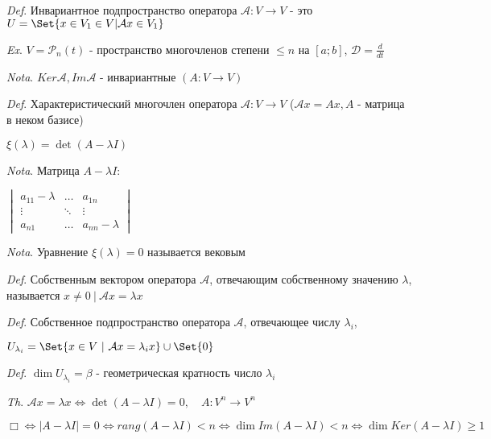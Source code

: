 \documentclass[12pt]{article}
\begin{document}
    \vspace{3mm}
\textit{Def}. Инвариантное подпространство оператора $\mathcal{A} : V \rightarrow V$ -
    это $U = \Set{x \in V_1 \in V | \mathcal{A}x \in V_1}$

    \vspace{3mm}
\textit{Ex}. $V = \mathcal{P}_n(t)$ - пространство многочленов степени $\leq n$ на $[a; b]$, $\displaystyle \mathcal{D} = \frac{d}{dt}$

    \vspace{3mm}
\textit{Nota}. $Ker \mathcal{A}, Im \mathcal{A}$ - инвариантные $(A : V \rightarrow V)$

    \vspace{3mm}
\textit{Def}. Характеристический многочлен оператора $\mathcal{A} : V \rightarrow V$
    ($\mathcal{A}x = Ax, A$ - матрица в неком базисе)

    $\xi(\lambda) = \det(A - \lambda I)$

    \vspace{3mm}
\textit{Nota}. Матрица $A - \lambda I$:

    $\begin{vmatrix}a_{11} - \lambda & \dots & a_{1n} \\ \vdots & \ddots & \vdots \\ a_{n1} & \dots & a_{nn} - \lambda \end{vmatrix}$

    \vspace{3mm}
\textit{Nota}. Уравнение $\xi(\lambda) = 0$ называется вековым

    \vspace{3mm}
\textit{Def}. Собственным вектором оператора $\mathcal{A}$, отвечающим собственному значению $\lambda$,
    называется $x \neq 0 \ | \ \mathcal{A}x = \lambda x$

    \vspace{3mm}
\textit{Def}. Собственное подпространство оператора $\mathcal{A}$, отвечающее числу $\lambda_i$,

    $U_{\lambda_i} = \Set{x \in V \ | \ \mathcal{A}x = \lambda_i x} \union \Set{0}$

    \vspace{3mm}
\textit{Def}. $\dim U_{\lambda_i} = \beta$ - геометрическая кратность число $\lambda_i$

    \vspace{3mm}
\textit{Th}. $\mathcal{A}x = \lambda x \Longleftrightarrow \det(A - \lambda I) = 0, \quad A : V^n \rightarrow V^n$

    $\Box \Longleftrightarrow |A - \lambda I| = 0 \Longleftrightarrow rang (A - \lambda I) < n \Longleftrightarrow
    \dim Im(A - \lambda I) < n \Longleftrightarrow \dim Ker(A - \lambda I) \geq 1$
\end{document}

